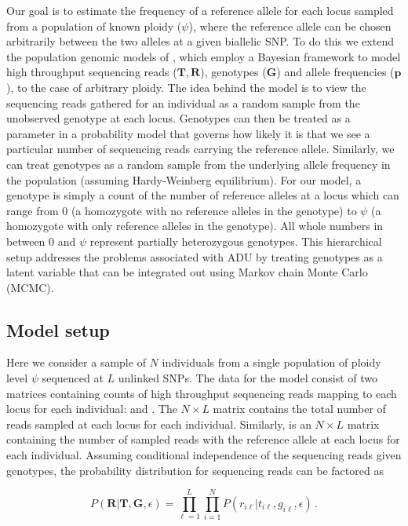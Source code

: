 \documentclass[11pt,english,letterpaper,oneside]{article}
\begin{document}
\noindent Our goal is to estimate the frequency of a reference allele for each locus sampled from a population of known ploidy ($\psi$), where the reference allele can be chosen arbitrarily between the two alleles at a given biallelic SNP. To do this we extend the population genomic models of \cite{buerkle2013popModels}, which employ a Bayesian framework to model high throughput sequencing reads ($\bm{T},\bm{R}$), genotypes ($\bm{G}$) and allele frequencies ($\bm{p}$), to the case of arbitrary ploidy. The idea behind the model is to view the sequencing reads gathered for an individual as a random sample from the unobserved genotype at each locus. Genotypes can then be treated as a parameter in a probability model that governs how likely it is that we see a particular number of sequencing reads carrying the reference allele. Similarly, we can treat genotypes as a random sample from the underlying allele frequency in the population (assuming Hardy-Weinberg equilibrium). For our model, a genotype is simply a count of the number of reference alleles at a locus which can range from 0 (a homozygote with no reference alleles in the genotype) to $\psi$ (a homozygote with only reference alleles in the genotype). All whole numbers in between 0 and $\psi$ represent partially heterozygous genotypes. This hierarchical setup addresses the problems associated with ADU by treating genotypes as a latent variable that can be integrated out using Markov chain Monte Carlo (MCMC).

\medskip
\subsection*{Model setup}
\medskip

Here we consider a sample of $N$ individuals from a single population of ploidy level $\psi$ sequenced at $L$ unlinked SNPs. The data for the model consist of two matrices containing counts of high throughput sequencing reads mapping to each locus for each individual: \rmat{} and \tmat. The $N \times L$ matrix \tmat{} contains the total number of reads sampled at each locus for each individual. Similarly, \rmat{} is an $N \times L$ matrix containing the number of sampled reads with the reference allele at each locus for each individual. Assuming conditional independence of the sequencing reads given genotypes, the probability distribution for sequencing reads can be factored as

\begin{equation}\label{factored_lik}
P(\bm{R}|\bm{T},\bm{G}, \epsilon) = \displaystyle\prod_{\ell=1}^L\displaystyle\prod_{i=1}^N P(r_{i \ell}|t_{i \ell},g_{i \ell}, \epsilon)\,.
\end{equation}
\end{document}
